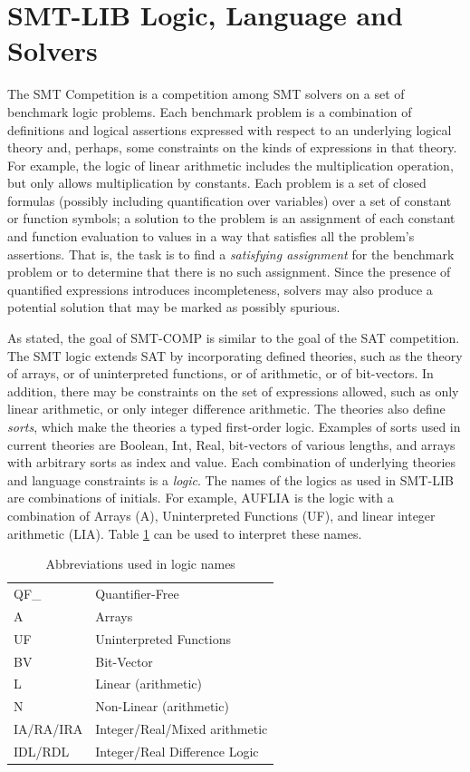 \documentclass[twoside,11pt]{article}
\begin{document}
\section{SMT-LIB Logic, Language and Solvers}
\label{sec:context}

The SMT Competition is a competition among SMT solvers on a set of benchmark logic problems. Each benchmark problem is a combination of definitions and logical assertions expressed with respect to an underlying logical theory and, perhaps, some constraints on the kinds of expressions in that theory. For example,  the logic of linear arithmetic includes the multiplication operation, but only allows multiplication by constants. Each problem is a set of closed formulas (possibly including quantification over variables) over a set of constant or function symbols; a solution to the problem is an assignment of each constant and function evaluation to values in a way that satisfies all the problem's assertions. That is, the task is to find a \emph{satisfying assignment} for the benchmark problem or to determine that there is no such assignment. Since the presence of quantified expressions introduces incompleteness, solvers may also produce a potential solution that may be marked as possibly spurious.

As stated, the goal of SMT-COMP is similar to the goal of the SAT competition. The SMT logic extends SAT by incorporating defined theories, such as the theory of arrays, or of uninterpreted functions, or of arithmetic, or of bit-vectors. In addition, there may be constraints on the set of expressions allowed, such as only linear arithmetic, or only integer difference arithmetic. The theories also define \emph{sorts}, which make the theories a typed first-order logic. Examples of sorts used in current theories are Boolean, Int, Real, bit-vectors of various lengths, and arrays with arbitrary sorts as index and value. Each combination of underlying theories and language constraints is a \emph{logic}.
The names of the logics as used in SMT-LIB are combinations of initials. For example, AUFLIA is the logic with a
combination of Arrays (A), Uninterpreted Functions (UF), and linear integer arithmetic (LIA). Table \ref{logicAbbreviations} can be used to interpret these names.
\begin{table}
\caption{Abbreviations used in logic names}
\label{logicAbbreviations}
\centering
\begin{tabular}{|l|l|}
\hline
QF\_ & Quantifier-Free \\
A & Arrays \\
UF & Uninterpreted Functions \\
BV & Bit-Vector \\
L & Linear (arithmetic) \\
N & Non-Linear (arithmetic) \\
IA/RA/IRA & Integer/Real/Mixed arithmetic \\
IDL/RDL & Integer/Real Difference Logic \\
\hline
\end{tabular}
\end{table}
\end{document}
